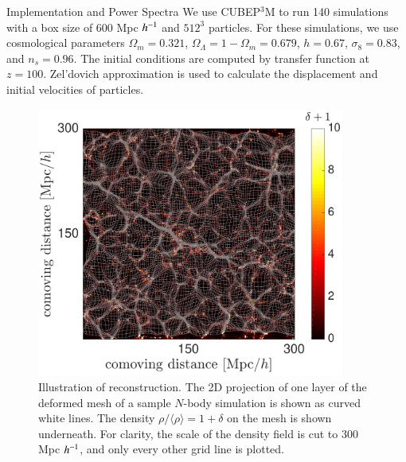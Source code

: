 \begin{section}{Implementation and Power Spectra}
  \label{sec:simulation}
  We use \textsc{CUBEP$^3$M} \citep{bib:Harnois2013} to run
  140 simulations with a box size of 600 Mpc $\textcolor{black}{h^{-1}}$ and $512^3$ particles.
  For these simulations, we use cosmological
  parameters $\Omega_m=0.321$, $\Omega_{\Lambda}=1-\Omega_m=0.679$,
  $h=0.67$, $\sigma_8=0.83$, and $n_s=0.96$.
  The initial conditions are computed by
  transfer function \citep{bib:Lewis2000}
  at $z=100$. 
  Zel'dovich
  approximation is used to calculate the displacement and initial velocities
  of particles.

  \begin{figure}
    \centering
    \includegraphics[width=0.9\textwidth]{fig1.pdf}
    \caption{ Illustration of  reconstruction.
      The 2\tcr{$-$}D projection of one layer of the deformed mesh of a sample
      $N$-body simulation is shown as curved white lines.  The
      density $\rho/\langle\rho\rangle=1+\delta$ on the mesh is shown
      underneath. For clarity, the scale of the density field is cut to 
      300 Mpc $\textcolor{black}{h^{-1}}$, and only every other grid line is plotted.}
    \label{fig:simandrec}
 \end{figure}


\end{section}
